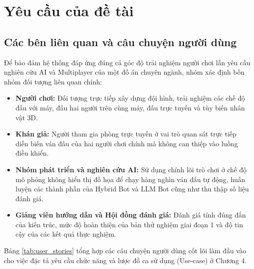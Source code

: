 \section{Yêu cầu của đề tài}

\subsection{Các bên liên quan và câu chuyện người dùng}
Để bảo đảm hệ thống đáp ứng đúng cả góc độ trải nghiệm người chơi lẫn yêu cầu nghiên cứu AI và Multiplayer của một đồ án chuyên ngành, nhóm xác định bốn nhóm đối tượng liên quan chính:
\begin{itemize}
    \item \textbf{Người chơi:} Đối tượng trực tiếp xây dựng đội hình, trải nghiệm các chế độ đấu với máy, đấu hai người trên cùng máy, đấu trực tuyến và tùy biến nhân vật 3D.
    \item \textbf{Khán giả:} Người tham gia phòng trực tuyến ở vai trò quan sát trực tiếp diễn biến ván đấu của hai người chơi chính mà không can thiệp vào luồng điều khiển.
    \item \textbf{Nhóm phát triển và nghiên cứu AI:} Sử dụng chính lõi trò chơi ở chế độ mô phỏng không hiển thị đồ họa để chạy hàng nghìn ván đấu tự động, huấn luyện các thành phần của Hybrid Bot và LLM Bot cũng như thu thập số liệu đánh giá.
    \item \textbf{Giảng viên hướng dẫn và Hội đồng đánh giá:} Đánh giá tính đúng đắn của kiến trúc, mức độ hoàn thiện của bản thử nghiệm giai đoạn 1 và độ tin cậy của các kết quả thực nghiệm.
\end{itemize}

Bảng \ref{tab:user_stories} tổng hợp các câu chuyện người dùng cốt lõi làm đầu vào cho việc đặc tả yêu cầu chức năng và lược đồ ca sử dụng (Use-case) ở Chương 4.

